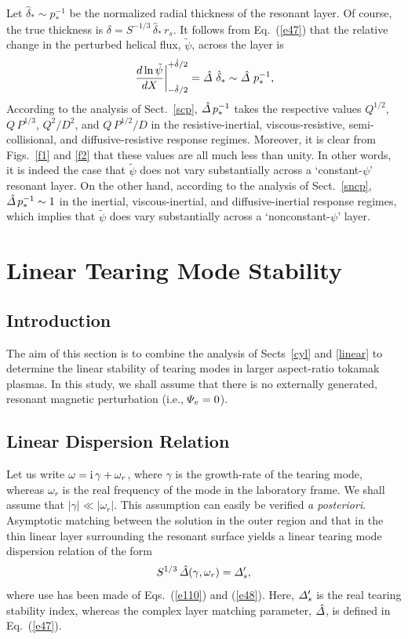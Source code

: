 \documentclass[12pt,prb,aps]{revtex4-1}
\begin{document}
Let $\hat{\delta}_\ast\sim p_\ast^{-1}$ be the normalized radial thickness of the resonant layer.  Of course, the true thickness is
$\delta = S^{-1/3}\,\hat{\delta}_\ast\,r_s$.  It follows from
Eq.~(\ref{e47}) that the relative change in the perturbed helical flux, $\tilde{\psi}$, across the layer
is
\begin{equation}
\left.\frac{d\ln\tilde{\psi}}{dX}\right|_{-\hat{\delta}/2}^{+\hat{\delta}/2} = \hat{\mit\Delta}\,\,\hat{\delta}_\ast\sim \hat{\mit\Delta}\,\,p_\ast^{-1},
\end{equation}
According to the  analysis of Sect.~\ref{scp}, $\hat{\mit\Delta}\,p_\ast^{-1}$ takes the respective values $Q^{1/2}$, $Q\,P^{1/3}$, 
$Q^2/D^2$, and $Q\,P^{1/2}/D$ in the resistive-inertial, viscous-resistive, semi-collisional, and
diffusive-resistive response regimes. Moreover, it is clear from Figs.~\ref{f1} and \ref{f2} that these values are all
much less than unity. In other words, it is indeed the case that $\tilde{\psi}$ does not vary substantially across a
`constant-$\psi$' resonant layer. On the other hand, according to the analysis of Sect.~\ref{sncp}, $\hat{\mit\Delta}\,p_\ast^{-1}\sim 1$ in the inertial,
viscous-inertial, and diffusive-inertial response regimes, which implies that $\tilde{\psi}$ does vary substantially
across a `nonconstant-$\psi$' layer. 

\section{Linear Tearing Mode Stability}\label{stab}
\subsection{Introduction}
The aim of this section is to combine the analysis of Sects~\ref{cyl} and \ref{linear} to determine the linear stability
of tearing modes in larger aspect-ratio  tokamak plasmas. In this study, we shall assume that there is no externally generated, resonant
magnetic perturbation (i.e., ${\mit\Psi}_v=0$). 

\subsection{Linear Dispersion Relation}\label{s6.2}
Let us write
$\omega = {\rm i}\,\gamma+\omega_r$, where $\gamma$ is the growth-rate of the tearing mode, whereas $\omega_r$ is the real
frequency of the mode in the laboratory frame. We shall assume that $|\gamma|\ll |\omega_r|$. This assumption can
easily be verified {\em a posteriori}. Asymptotic matching between the solution in the outer region and that in the
thin linear layer surrounding the resonant surface yields a linear tearing mode dispersion relation of the form
\begin{equation}\label{e352}
S^{1/3}\,\hat{\mit\Delta}(\gamma,\omega_r) = {\mit\Delta}_s',
\end{equation}
where use has been made of Eqs.~(\ref{e110}) and (\ref{e48}). Here, ${\mit\Delta}_s'$ is the real tearing stability index, 
whereas the complex layer matching parameter, $\hat{\mit\Delta}$, is defined in Eq.~(\ref{e47}). 
\end{document}
